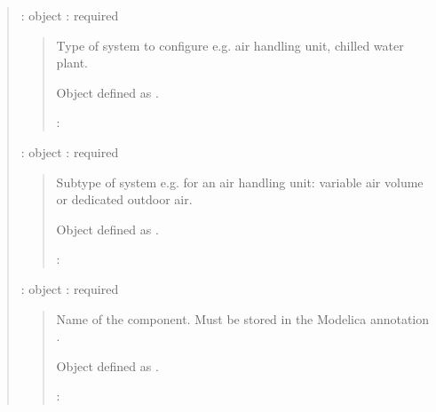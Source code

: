 \documentclass[letterpaper,10pt, openany,english]{sphinxmanual}
\begin{document}
\label{\detokenize{requirements:configuration-api}}
\begin{quote}

 : object : required
\begin{quote}

\begin{DUlineblock}{0em}
\item[] Type of system to configure e.g. air handling unit, chilled water plant.
\item[] Object defined as {\hyperref[\detokenize{requirements:elementary-object}]{}}.
\end{DUlineblock}

 : 
\end{quote}

 : object : required
\begin{quote}

\begin{DUlineblock}{0em}
\item[] Subtype of system e.g. for an air handling unit: variable air volume or dedicated outdoor air.
\item[] Object defined as {\hyperref[\detokenize{requirements:elementary-object}]{}}.
\end{DUlineblock}

 : 
\end{quote}

 : object : required
\begin{quote}

\begin{DUlineblock}{0em}
\item[] Name of the component. Must be stored in the Modelica annotation .
\item[] Object defined as {\hyperref[\detokenize{requirements:elementary-object}]{}}.
\end{DUlineblock}

 : 
\end{quote}


\end{quote}
\end{document}
